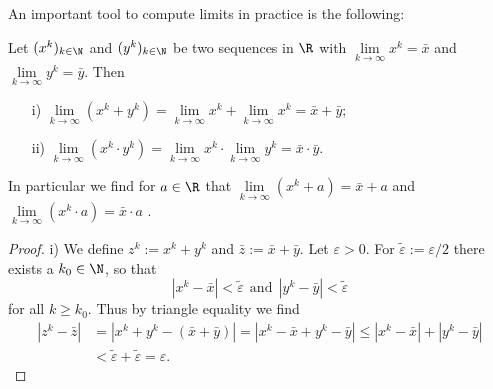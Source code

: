 %
\begin{frame} 
%
An important tool to compute limits in practice is the following:
\begin{theo}
	Let $(x^k)_{k\in \N}$ and $(y^k)_{k\in \N}$ be two sequences in $\R$ with $\lim\limits_{k\to\infty}x^k= \bar{x}$ and $\lim\limits_{k\to\infty}y^k= \bar{y}$. Then
	\begin{itemize}
		\item[i)] $\lim\limits_{k\to\infty} (x^k + y^k) = \lim\limits_{k\to\infty}x^k + \lim\limits_{k\to\infty}x^k = \bar{x}+\bar{y}$;
		\item[ii)] $\lim\limits_{k\to\infty} (x^k\cdot y^k) = \lim\limits_{k\to\infty}x^k \cdot \lim\limits_{k\to\infty}y^k = \bar{x}\cdot\bar{y}$.
	\end{itemize}
	In particular we find for $a \in \R$ that $\lim\limits_{k\to\infty} (x^k + a) = \bar{x} +a$ and $\lim\limits_{k\to\infty} (x^k \cdot a) = \bar{x}\cdot a$ .
\end{theo} 
\begin{proof} \footnotesize
	i) We define $z^k := x^k + y^k$ and $\bar{z} := \bar{x} + \bar{y}$. Let $\varepsilon>0$. For ${\tilde{\varepsilon}} := \varepsilon/{2}$ there exists a $k_0 \in \N$, so that
	$$|x^k-\bar{x}| <  \tilde{\varepsilon} ~~\text{and}~~|y^k-\bar{y}| <  \tilde{\varepsilon}$$
	for all $k \geq k_0$. Thus by triangle equality we find
	\begin{align*}
	|z^k - \bar{z}| &= |x^k+y^k - (\bar{x} + \bar{y})| 
	= |x^k- \bar{x} +y^k - \bar{y}| 
	\leq |x^k- \bar{x}| + |y^k - \bar{y}| \\
	&<  \tilde{\varepsilon}+\tilde{\varepsilon} = \varepsilon.
	\end{align*}


\end{proof}
\end{frame}
